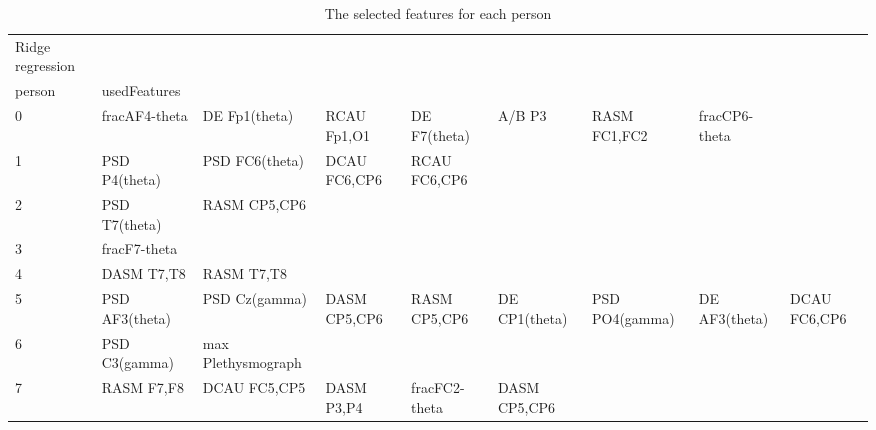 \clearpage
\begin{landscape}
\begin{table}[]
\centering
\caption{The selected features for each person}
\begin{tabular}{l|llllllll}
Ridge regression   &                      &                         &                      &                    &                       &                      &                 &                 \\
person             & usedFeatures         &                         &                      &                    &                       &                      &                 &                 \\
0                  & fracAF4-theta        & DE Fp1(theta)           & RCAU Fp1,O1          & DE F7(theta)       & A/B P3                & RASM FC1,FC2         & fracCP6-theta   &                 \\
1                  & PSD P4(theta)        & PSD FC6(theta)          & DCAU FC6,CP6         & RCAU FC6,CP6       &                       &                      &                 &                 \\
2                  & PSD T7(theta)        & RASM CP5,CP6            &                      &                    &                       &                      &                 &                 \\
3                  & fracF7-theta         &                         &                      &                    &                       &                      &                 &                 \\
4                  & DASM T7,T8           & RASM T7,T8              &                      &                    &                       &                      &                 &                 \\
5                  & PSD AF3(theta)       & PSD Cz(gamma)           & DASM CP5,CP6         & RASM CP5,CP6       & DE CP1(theta)         & PSD PO4(gamma)       & DE AF3(theta)   & DCAU FC6,CP6    \\
6                  & PSD C3(gamma)        & max Plethysmograph      &                      &                    &                       &                      &                 &                 \\
7                  & RASM F7,F8           & DCAU FC5,CP5            & DASM P3,P4           & fracFC2-theta      & DASM CP5,CP6          &                      &                 &                 \\

\end{tabular}
\end{table}
\end{landscape}
